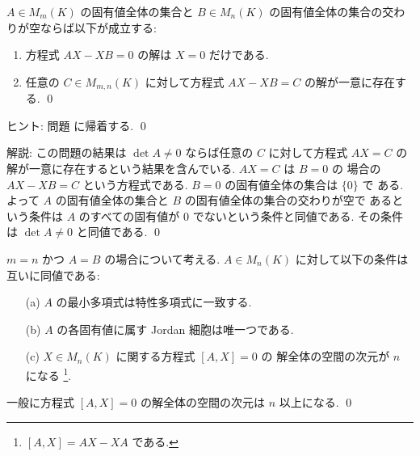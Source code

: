 \documentclass[12pt,twoside]{jarticle}
\begin{document}

\begin{question}
\label{q:A-cap-B=empty}
  $A\in M_m(K)$ の固有値全体の集合と $B\in M_n(K)$ の固有値全体の集合の交わ
  りが空ならば以下が成立する:
  \begin{enumerate}
  \item 方程式 $AX-XB=0$ の解は $X=0$ だけである.
  \item 任意の $C\in M_{m,n}(K)$ に対して方程式 $AX-XB=C$ の解が一意に存在す
    る.
    \qed
  \end{enumerate}
\end{question}

\noindent
ヒント: 問題  に帰着する.
\qed

\medskip
\noindent
解説: この問題の結果は $\det A\ne 0$ ならば任意の $C$ に対して方程式 $AX=C$ 
の解が一意に存在するという結果を含んでいる.  $AX=C$ は $B=0$ の
場合の $AX-XB=C$ という方程式である.  $B=0$ の固有値全体の集合は $\{0\}$ で
ある.  よって $A$ の固有値全体の集合と $B$ の固有値全体の集合の交わりが空で
あるという条件は $A$ のすべての固有値が $0$ でないという条件と同値である.
その条件は $\det A\ne 0$ と同値である.
\qed


\begin{question}
\label{q:A=B-generic}
  $m=n$ かつ $A=B$ の場合について考える.
  $A\in M_n(K)$ に対して以下の条件は互いに同値である:
  \begin{enumerate}
  \item[(a)] $A$ の最小多項式は特性多項式に一致する.
  \item[(b)] $A$ の各固有値に属す Jordan 細胞は唯一つである.
  \item[(c)] $X\in M_n(K)$ に関する方程式 $[A,X]=0$ の
    解全体の空間の次元が $n$ になる%
    \footnote{$[A,X]=AX-XA$ である.}.
  \end{enumerate}
  一般に方程式 $[A,X]=0$ の解全体の空間の次元は $n$ 以上になる.
  \qed
\end{question}
\end{document}
